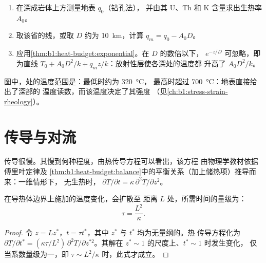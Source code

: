 \begin{method}[深成岩体之下的温度]\label{met:b1:heat-budget:moho}
\begin{enumerate}
  \item 在深成岩体上方测量地表 $q_0$（钻孔法），
        并由其 U、Th 和 K 含量求出生热率 $A_0$。
  \item 取该省的线，或取 $D$ 约为
        \qty{10}{km}，计算 $q_m = q_0 - A_0 D$。
  \item 应用\cref{thm:b1:heat-budget:exponential}。在 $D$ 的数倍以下，
        $e^{-z/D}$ 可忽略，即为直线
        $T_0 + A_0D^2/k + q_m z/k$：放射性层使各深处的温度都
        升高了 $A_0D^2/k$。
\end{enumerate}
\end{method}

图中，处的温度范围是：最低时约为 \qty{320}{\degreeCelsius}，
最高时超过 \qty{700}{\degreeCelsius}：地表直接给出了深部的
温度读数，而该温度决定了其强度
（见\cref{ch:b1:stress-strain-rheology}）。

\section{传导与对流}

传导很慢。其慢到何种程度，由热传导方程可以看出，该方程
由物理学教材依据傅里叶定律及
\cref{thm:b1:heat-budget:balance}中的平衡关系（加上储热项）推导而来：一维情形下，
无生热时，
$\partial T/\partial t = \kappa\,\partial^2 T/\partial z^2$。

\begin{proposition}[传导时间尺度]\label{prop:b1:heat-budget:timescale}
在导热体边界上施加的温度变化，会扩散至
距离 $L$ 处，所需时间的量级为：
\[
  \tau = \frac{L^2}{\kappa} .
\]
\end{proposition}

\begin{proof}
令 $z = L z^*$，$t = \tau t^*$，其中 $z^*$ 与 $t^*$ 均为无量纲的。热
传导方程化为 $\partial T/\partial t^* = (\kappa\tau/L^2)\,\partial^2
T/\partial z^{*2}$。其解在 $z^* \sim 1$ 的尺度上、$t^* \sim 1$ 时发生变化，
仅当系数量级为一，即 $\tau \sim L^2/\kappa$ 时，此式才成立。
\end{proof}

